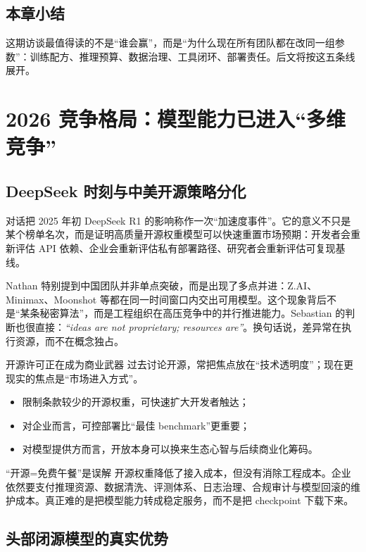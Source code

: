 \documentclass[a4paper]{article}
\begin{document}
\subsection{本章小结}

这期访谈最值得读的不是“谁会赢”，而是“为什么现在所有团队都在改同一组参数”：训练配方、推理预算、数据治理、工具闭环、部署责任。后文将按这五条线展开。

\section{2026 竞争格局：模型能力已进入“多维竞争”}

\subsection{DeepSeek 时刻与中美开源策略分化}

对话把 2025 年初 DeepSeek R1 的影响称作一次“加速度事件”。它的意义不只是某个榜单名次，而是证明高质量开源权重模型可以快速重置市场预期：开发者会重新评估 API 依赖、企业会重新评估私有部署路径、研究者会重新评估可复现基线。

Nathan 特别提到中国团队并非单点突破，而是出现了多点并进：Z.AI、Minimax、Moonshot 等都在同一时间窗口内交出可用模型。这个现象背后不是“某条秘密算法”，而是工程组织在高压竞争中的并行推进能力。Sebastian 的判断也很直接：\textit{``ideas are not proprietary; resources are''}。换句话说，差异常在执行资源，而不在概念独占。

\begin{importantbox}{开源许可正在成为商业武器}
过去讨论开源，常把焦点放在“技术透明度”；现在更现实的焦点是“市场进入方式”。
\begin{itemize}[leftmargin=1.5em]
    \item 限制条款较少的开源权重，可快速扩大开发者触达；
    \item 对企业而言，可控部署比“最佳 benchmark”更重要；
    \item 对模型提供方而言，开放本身可以换来生态心智与后续商业化筹码。
\end{itemize}
\end{importantbox}

\begin{warningbox}{“开源=免费午餐”是误解}
开源权重降低了接入成本，但没有消除工程成本。企业依然要支付推理资源、数据清洗、评测体系、日志治理、合规审计与模型回滚的维护成本。真正难的是把模型能力转成稳定服务，而不是把 checkpoint 下载下来。
\end{warningbox}

\subsection{头部闭源模型的真实优势}
\end{document}
